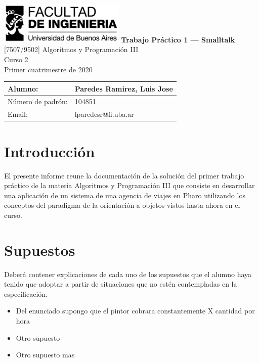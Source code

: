 \documentclass[titlepage,a4paper]{article}
\begin{document}
\begin{titlepage} %
	\hfill\includegraphics[width=6cm]{logofiuba.jpg}
    \centering
    \vfill
    \Huge \textbf{Trabajo Práctico 1 — Smalltalk}
    \vskip2cm
    \Large [7507/9502] Algoritmos y Programación III\\
    Curso 2 \\ %
    Primer cuatrimestre de 2020 
    \vfill
    \begin{tabular}{ | l | l | } %
      \hline
      Alumno: & Paredes Ramirez, Luis Jose \\ \hline
      Número de padrón: & 104851 \\ \hline
      Email: & lparedesr@fi.uba.ar \\ \hline
  	\end{tabular}
    \vfill
    \vfill
\end{titlepage}

\tableofcontents %
\newpage

\section{Introducción}\label{sec:intro}
El presente informe reune la documentación de la solución del primer trabajo práctico de la materia Algoritmos y Programación III 
que consiste en desarrollar una aplicación de un sistema de una agencia de viajes en Pharo utilizando los conceptos del 
paradigma de la orientación a objetos vistos hasta ahora en el curso.

\section{Supuestos}\label{sec:supuestos}

Deberá contener explicaciones de cada uno de los supuestos 
que el alumno haya tenido que adoptar a partir de situaciones 
que no estén contempladas en la especificación.

  \begin{itemize}
    \item Del enunciado supongo que el pintor cobrara constantemente X cantidad por hora
    \item Otro supuesto
    \item Otro supuesto mas 
  \end{itemize}
\end{document}

